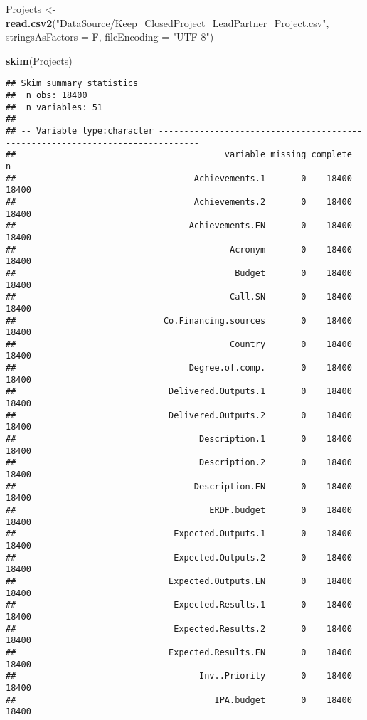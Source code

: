 \documentclass[]{article}
\newenvironment{Shaded}{\begin{snugshade}}{\end{snugshade}}
\newcommand{\DataTypeTok}[1]{\textcolor[rgb]{0.13,0.29,0.53}{#1}}
\newcommand{\KeywordTok}[1]{\textcolor[rgb]{0.13,0.29,0.53}{\textbf{#1}}}
\newcommand{\NormalTok}[1]{#1}
\newcommand{\StringTok}[1]{\textcolor[rgb]{0.31,0.60,0.02}{#1}}
\begin{document}
\begin{Shaded}
\begin{Highlighting}[]
\NormalTok{Projects <-}\StringTok{ }\KeywordTok{read.csv2}\NormalTok{(}\StringTok{"DataSource/Keep_ClosedProject_LeadPartner_Project.csv"}\NormalTok{, }\DataTypeTok{stringsAsFactors =}\NormalTok{ F, }\DataTypeTok{fileEncoding =} \StringTok{"UTF-8"}\NormalTok{)}

\KeywordTok{skim}\NormalTok{(Projects)}
\end{Highlighting}
\end{Shaded}

\begin{verbatim}
## Skim summary statistics
##  n obs: 18400 
##  n variables: 51 
## 
## -- Variable type:character ------------------------------------------------------------------------------
##                                         variable missing complete     n
##                                   Achievements.1       0    18400 18400
##                                   Achievements.2       0    18400 18400
##                                  Achievements.EN       0    18400 18400
##                                          Acronym       0    18400 18400
##                                           Budget       0    18400 18400
##                                          Call.SN       0    18400 18400
##                             Co.Financing.sources       0    18400 18400
##                                          Country       0    18400 18400
##                                  Degree.of.comp.       0    18400 18400
##                              Delivered.Outputs.1       0    18400 18400
##                              Delivered.Outputs.2       0    18400 18400
##                                    Description.1       0    18400 18400
##                                    Description.2       0    18400 18400
##                                   Description.EN       0    18400 18400
##                                      ERDF.budget       0    18400 18400
##                               Expected.Outputs.1       0    18400 18400
##                               Expected.Outputs.2       0    18400 18400
##                              Expected.Outputs.EN       0    18400 18400
##                               Expected.Results.1       0    18400 18400
##                               Expected.Results.2       0    18400 18400
##                              Expected.Results.EN       0    18400 18400
##                                    Inv..Priority       0    18400 18400
##                                       IPA.budget       0    18400 18400

\end{verbatim}
\end{document}
